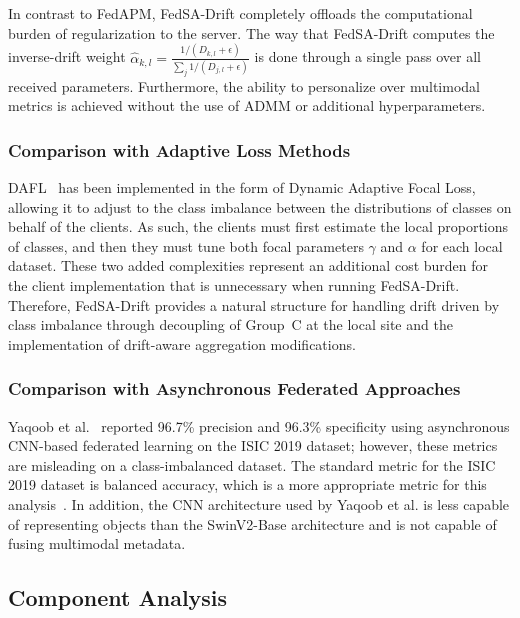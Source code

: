\documentclass{ieeeaccess}
\newcommand{\sadrift}{FedSA-Drift}
\begin{document}
In contrast to FedAPM, \sadrift{} completely offloads the computational burden of regularization to the server. The way that \sadrift{} computes the inverse-drift weight $\hat{\alpha}_{k,l} = \frac{1/(D_{k,l} + \epsilon)}{\sum_j 1/(D_{j,l} + \epsilon)}$ is done through a single pass over all received parameters. Furthermore, the ability to personalize over multimodal metrics is achieved without the use of ADMM or additional hyperparameters.

\subsubsection{Comparison with Adaptive Loss Methods}

DAFL~\cite{Zhao2025} has been implemented in the form of Dynamic Adaptive Focal Loss, allowing it to adjust to the class imbalance between the distributions of classes on behalf of the clients. As such, the clients must first estimate the local proportions of classes, and then they must tune both focal parameters $\gamma$ and $\alpha$ for each local dataset. These two added complexities represent an additional cost burden for the client implementation that is unnecessary when running \sadrift{}. Therefore, \sadrift{} provides a natural structure for handling drift driven by class imbalance through decoupling of Group~C at the local site and the implementation of drift-aware aggregation modifications.

\subsubsection{Comparison with Asynchronous Federated Approaches}

Yaqoob et al.~\cite{Yaqoob2023} reported 96.7\% precision and 96.3\% specificity using asynchronous CNN-based federated learning on the ISIC 2019 dataset; however, these metrics are misleading on a class-imbalanced dataset. The standard metric for the ISIC 2019 dataset is balanced accuracy, which is a more appropriate metric for this analysis~\cite{Gessert2020}. In addition, the CNN architecture used by Yaqoob et al. is less capable of representing objects than the SwinV2-Base architecture and is not capable of fusing multimodal metadata.

\subsection{Component Analysis}
\label{sec:component_analysis}
\end{document}
